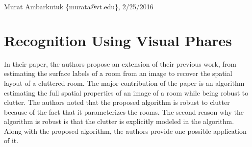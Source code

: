 \documentclass[11pt]{article}
\begin{document}
\thispagestyle{empty}
\begin{flushright}
	\small{Murat Ambarkutuk \{murata@vt.edu\}, 2/25/2016}
\end{flushright}
\section{Recognition Using Visual Phares}
In their paper, the authors propose an extension of their previous work, from estimating the surface labels of a room from an image to recover the spatial layout of a cluttered room.
The major contribution of the paper is an algorithm estimating the full spatial properties of an image of a room while being robust to clutter.
The authors noted that the proposed algorithm is robust to clutter because of the fact that it parameterizes the rooms.
The second reason why the algorithm is robust is that the clutter is explicitly modeled in the algorithm.
Along with the proposed algorithm, the authors provide one possible application of it.
\end{document}
